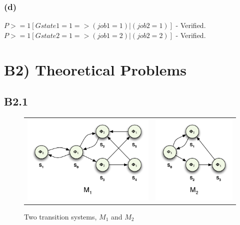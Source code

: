 \documentclass[12pt]{report}
\begin{document}
\subsubsection*{(d)}
$P>=1 [G state1=1=>(job1=1)|(job2=1)]$ - Verified.\\
$P>=1 [G state2=1=>(job1=2)|(job2=2)]$ - Verified.

\section*{B2) Theoretical Problems}
\subsection*{B2.1}

\begin{figure}[H]
	\centering
	\begin{tabular}{ l r }
		\includegraphics[scale=0.75]{../GFX/ExerciseFigure2-M1.pdf}
		& \includegraphics[scale=0.75]{../GFX/ExerciseFigure2-M2.pdf}
	\end{tabular}
	\caption{Two transition systems, $M_1$ and $M_2$}
\end{figure}
\end{document}
